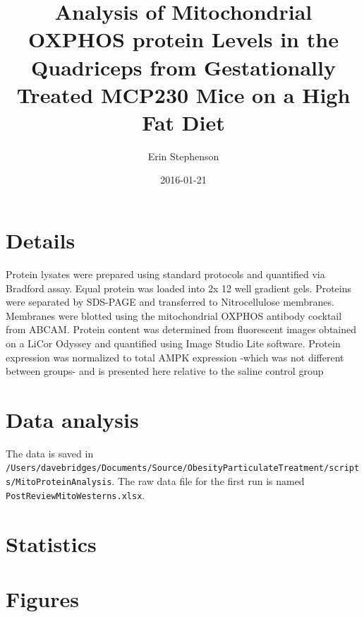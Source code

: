 \documentclass{article}
\begin{document}


\title{Analysis of Mitochondrial OXPHOS protein Levels in the Quadriceps from Gestationally Treated MCP230 Mice on a High Fat Diet}
\author{Erin Stephenson}
\date{2016-01-21}
\maketitle

\section*{Details}
{Protein lysates were prepared using standard protocols and quantified via Bradford assay. Equal protein was loaded into 2x 12 well gradient gels. Proteins were separated by SDS-PAGE and transferred to Nitrocellulose membranes. Membranes were blotted using the mitochondrial OXPHOS antibody cocktail from ABCAM. Protein content was determined from fluorescent images obtained on a LiCor Odyssey and quantified using Image Studio Lite software. Protein expression was normalized to total AMPK expression -which was not different between groups- and is presented here relative to the saline control group}
\section*{Data analysis}

The data is saved in \verb+/Users/davebridges/Documents/Source/ObesityParticulateTreatment/scripts/MitoProteinAnalysis+.  The raw data file for the first run is named \verb+PostReviewMitoWesterns.xlsx+.  

\section*{Statistics}
\section*{Figures}
\end{document}
